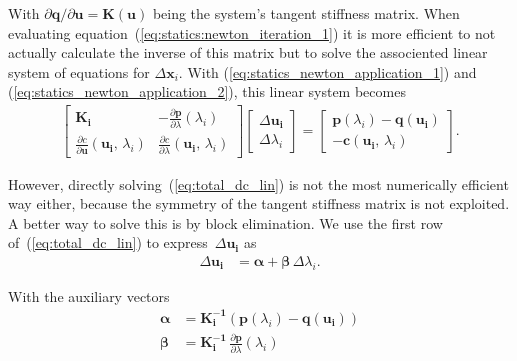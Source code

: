 With $\partial \boldsymbol{q} / \partial \boldsymbol{u} = \boldsymbol{K}(\boldsymbol{u})$ being the system's tangent stiffness matrix.
When evaluating equation~(\ref{eq:statics:newton_iteration_1}) it is more efficient to not actually calculate the inverse of this matrix but to solve the associented linear system of equations for $\Delta\boldsymbol{x}_i$.
With (\ref{eq:statics_newton_application_1}) and (\ref{eq:statics_newton_application_2}), this linear system becomes
%
\begin{align}
\begin{bmatrix}
\boldsymbol{K_{i}} & -\frac{\partial \boldsymbol{p}}{\partial \lambda}(\lambda_i)\\
\frac{\partial c}{\partial \boldsymbol{u}}(\boldsymbol{u_{i}},\,\lambda_{i}) & \frac{\partial c}{\partial \lambda}(\boldsymbol{u_{i}},\,\lambda_{i})
\end{bmatrix}
\begin{bmatrix}
\Delta\boldsymbol{u_{i}}\\
\Delta \lambda_{i}
\end{bmatrix}
=
\begin{bmatrix}
\boldsymbol{p}(\lambda_i) - \boldsymbol{q}(\boldsymbol{u_{i}})\\
-\boldsymbol{c}(\boldsymbol{u_{i}},\,\lambda_{i})
\end{bmatrix}.\label{eq:total_dc_lin}
\end{align}

However, directly solving~(\ref{eq:total_dc_lin}) is not the most numerically efficient way either, because the symmetry of the tangent stiffness matrix is not exploited.
A better way to solve this is by block elimination.
We use the first row of~(\ref{eq:total_dc_lin}) to express~$\Delta\boldsymbol{u_{i}}$ as
%
\begin{align}
\Delta\boldsymbol{u_{i}} &= \boldsymbol{\alpha} + \boldsymbol{\beta}\,\Delta \lambda_{i}.\label{eq:auxiliary_disp_dc}
\end{align}

With the auxiliary vectors
%
\begin{align}
\boldsymbol{\alpha} &= \boldsymbol{K_{i}^{-1}}(\boldsymbol{p}(\lambda_i) - \boldsymbol{q}(\boldsymbol{u_{i}}))\label{eq:auxiliary_1}\\
\boldsymbol{\beta} &= \boldsymbol{K_{i}^{-1}}\,\frac{\partial \boldsymbol{p}}{\partial \lambda}(\lambda_i)\label{eq:auxiliary_2}
\end{align}

